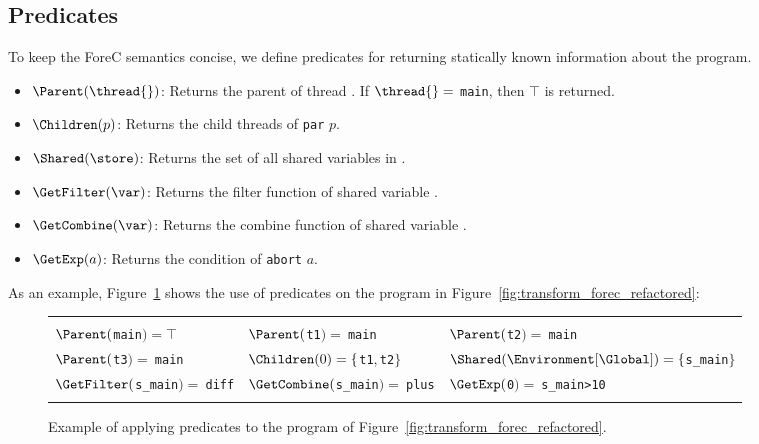 
\subsection{Predicates}
To keep the ForeC semantics concise, we define predicates for returning 
statically known information about the program. 
\begin{itemize}
	\item $\Parent(\thread{})$:
		Returns the parent of thread \thread{}.
		If $\thread{} =$ \verb$main$, then $\top$ is returned.
	\item $\Children(p)$:
		Returns the child threads of \verb$par$ $p$.
	\item $\Shared(\store)$:
		Returns the set of all shared variables in \store{}.
	\item $\GetFilter(\var)$:
		Returns the filter function of shared variable \var{}.
	\item $\GetCombine(\var)$:
		Returns the combine function of shared variable \var{}.
	\item $\GetExp(a)$:
		Returns the condition \expression{} of \verb$abort$ $a$.
\end{itemize}
As an example, Figure~\ref{fig:forec_predicates} shows the use of predicates on
the program in Figure~\ref{fig:transform_forec_refactored}:
\begin{figure}[ht]
	\centering
	\begin{tabular}{|l l l|}
		\hline
																			&												&														\\
		$\Parent($\verb$main$$) = \top$										& $\Parent($\verb$t1$$) =~$\verb$main$			& $\Parent($\verb$t2$$) =~$\verb$main$					\\
		$\Parent($\verb$t3$$) =~$\verb$main$								& $\Children(0) = \{$\verb$t1$$,$\verb$t2$$\}$	& $\Shared(\Environment[\Global]) = \{$\verb$s_main$$\}$\\
		$\GetFilter($\verb$s_main$$) =~$\verb$diff$							& $\GetCombine($\verb$s_main$$) =~$\verb$plus$	& $\GetExp($\verb$0$$) =~$\verb$s_main>10$				\\
																			&												&														\\
		\hline
	\end{tabular}
	
	\caption{Example of applying predicates to the program of Figure~\ref{fig:transform_forec_refactored}.}
	\label{fig:forec_predicates}
\end{figure}

